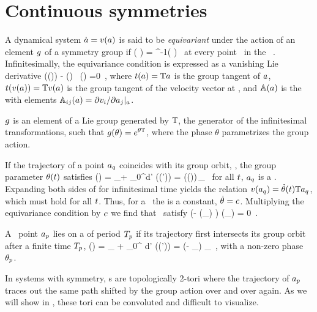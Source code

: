 \section{Continuous symmetries}
\label{s:symm}

A dynamical system $\dot{a}={v}(a)$ is said to be
\emph{equivariant} under the action of an element $g$ of a
symmetry group if
\beq
	\vel( \ssp ) =  \LieEl^{-1}\vel( \LieEl \ssp )
	\,
at every point \ssp\ in the \statesp\ \pS.
Infinitesimally, the equivariance condition
 is expressed as a vanishing Lie derivative
\beq
  \groupTan(\vel(\ssp))  - \Mvar(\ssp) \, \groupTan(\ssp) =0
  \,,
where
$ t(a) = \mathbb{T} a $ is the group tangent of $a$,
$ t({v}(a)) = \mathbb{T} {v}(a) $ is the group tangent of
the velocity vector at \ssp,
and $\mathbb{A}(a)$ is the \stabmat\, with elements
$\mathbb{A}_{ij}(a)={\partial {v}_i}/{\partial a_j}|_{a}$.

$g$
is an element of a Lie group generated by $\mathbb{T}$, the generator of the
infinitesimal transformations, such that $g(\theta) = e^{\theta
\mathbb{T}}$, where the phase $\theta$ parametrizes the group action.


If the trajectory of a point $a_q$ coincides with its group
orbit, \ie, the group parameter $\theta (t)$ satisfies
\beq
\ssp (\zeit)
    = \ssp_\stagn + \int_0^\zeit \!\!d\zeit' \vel(\ssp (\zeit'))
    = \LieEl (\theta (\zeit))\,\ssp_\stagn
  \,
for all $t$, $a_q$ is a \emph{\reqv}. Expanding
both sides of  for infinitesimal time yields the
relation ${v}(a_q) = \dot{\theta}(t) \mathbb{T} a_q$, which
must hold for all $t$. Thus, for a \reqv\ the  \emph{\phaseVel}
is a constant, $\dot{\theta} = c$. Multiplying the equivariance condition
 by $c$ we find that \reqva\ satisfy
\beq
(\velRel \Lg - \Mvar (\ssp_\stagn) ) \vel (\ssp_\stagn) = 0
\,.

A \statesp\ point $a_{p}$ lies on a \emph{\rpo} of period
${T_{p}}$ if its trajectory first intersects its group orbit after
a finite time ${T_{p}}$,
\beq
\ssp(\period{\rpprime})
    = \ssp_\rpprime
     + \int_0^\period{\rpprime} \!\!\!d\tau' \vel(\ssp (\tau'))
    = \LieEl (- \theta_\rpprime ) \ssp_\rpprime
  \,,
with a non-zero phase $\theta_{p}$.

In systems with  symmetry, \rpo s are
topologically 2-tori where the trajectory of $a_{p}$ traces out the
same path shifted by the group action over and over again. As we will
show in , these tori can be convoluted and
difficult to visualize.

